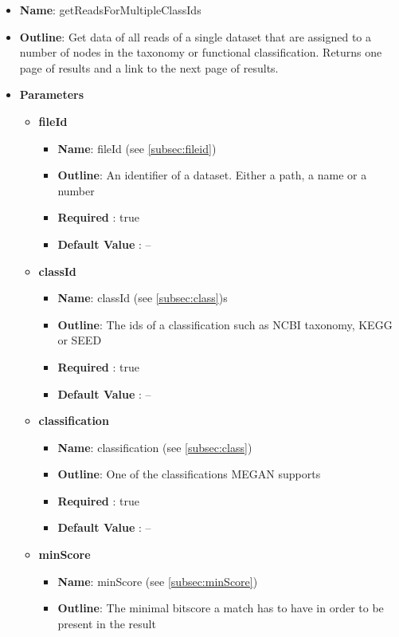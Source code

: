\documentclass[11pt]{article}
\begin{document}
\begin{itemize}
	\item \textbf{Name}: getReadsForMultipleClassIds
	\item \textbf{Outline}: Get data of all reads of a single dataset that are assigned to a number of nodes in the taxonomy or functional classification. Returns one page of results and a link to the next page of results.
	\item \textbf{Parameters}
		\begin{itemize}
			\item \textbf{fileId}
				\begin{itemize}
					\item \textbf{Name}: fileId (see \ref{subsec:fileid})
					\item \textbf{Outline}: An identifier of a dataset. Either a path, a name or a number
					\item \textbf{Required} : true
					\item \textbf{Default Value} : --
				\end{itemize}
			\item \textbf{classId}
				\begin{itemize}
					\item \textbf{Name}: classId (see \ref{subsec:class})s
					\item \textbf{Outline}: The ids of a classification such as NCBI taxonomy, KEGG or SEED
					\item \textbf{Required} : true
					\item \textbf{Default Value} : --
				\end{itemize}
			\item \textbf{classification}
				\begin{itemize}
					\item \textbf{Name}: classification (see \ref{subsec:class})
					\item \textbf{Outline}: One of the classifications MEGAN supports
					\item \textbf{Required} : true
					\item \textbf{Default Value} : --
				\end{itemize}
			\item \textbf{minScore}
				\begin{itemize}
					\item \textbf{Name}: minScore (see \ref{subsec:minScore})
					\item \textbf{Outline}: The minimal bitscore a match has to have in order to be present in the result

\end{itemize}
\end{itemize}
\end{itemize}
\end{document}
